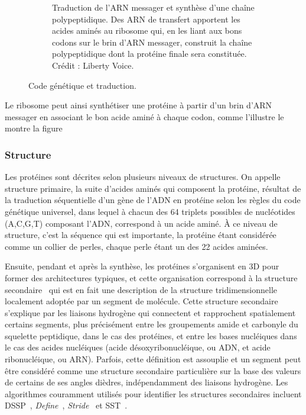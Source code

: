 \begin{figure}[htb]
\begin{subfigure}[t]{0.54\textwidth}
			\caption[Traduction de l'ARN messager en protéine]{Traduction de l'ARN messager et synthèse d'une chaîne polypeptidique. Des ARN de transfert apportent les acides aminés au ribosome qui, en les liant aux bons codons sur le brin d'ARN messager, construit la chaîne polypeptidique dont la protéine finale sera constituée. Crédit : Liberty Voice\footnotemark{}.}
			\label{fig:translation}
		\end{subfigure}
		\label{fig:codeTrans}
		\caption{Code génétique et traduction.}
	\end{figure}
	
	\addtocounter{footnote}{-1}
	\addtocounter{footnote}{1}
	
	Le ribosome peut ainsi synthétiser une protéine à partir d'un brin d'ARN messager en associant le bon acide aminé à chaque codon, comme l'illustre le montre la figure
	
	\subsubsection{Structure}
	Les protéines sont décrites selon plusieurs niveaux de structures. On appelle structure primaire, la suite d'acides aminés qui composent la protéine, résultat de la traduction séquentielle d'un gène de l'ADN en protéine selon les règles du code génétique universel, dans lequel à chacun des 64 triplets possibles de nucléotides (A,C,G,T) composant l'ADN, correspond à un acide aminé. À ce niveau de structure, c'est la séquence qui est importante, la protéine étant considérée comme un collier de perles, chaque perle étant un des 22 acides aminées.
	
	Ensuite, pendant et après la synthèse, les protéines s'organisent en 3D pour former des architectures typiques, et cette organisation correspond à la structure secondaire~\cite{foltmann1981protein} qui est en fait une description de la structure tridimensionnelle localement adoptée par un segment de molécule. Cette structure secondaire s'explique par les liaisons hydrogène qui connectent et rapprochent spatialement certains segments, plus précisément entre les groupements amide et carbonyle du squelette peptidique, dans le cas des protéines, et entre les bases nucléiques dans le cas des acides nucléiques (acide désoxyribonucléique, ou ADN, et acide ribonucléique, ou ARN). Parfois, cette définition est assouplie et un segment peut être considéré comme une structure secondaire particulière sur la base des valeurs de certains de ses angles dièdres, indépendamment des liaisons hydrogène. Les algorithmes couramment utilisés pour identifier les structures secondaires incluent DSSP~\cite{kabsch1983dictionary}, \emph{Define}~\cite{richards1988identification}, \emph{Stride}~\cite{frishman1995knowledge} et SST~\cite{konagurthu2012minimum}.
		
